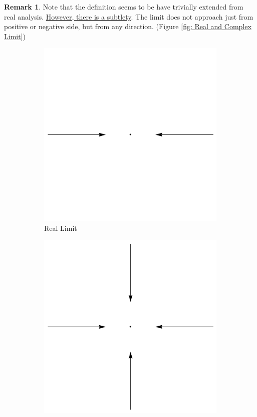 \documentclass[a4paper, 12pt]{article}
\theoremstyle{definition}
\newtheorem{remark}{Remark}
\numberwithin{definition}{section}
\numberwithin{exercise}{section}
\numberwithin{remark}{section}
\numberwithin{figure}{section}
\begin{document}
\begin{remark}
    Note that the definition seems to be have trivially extended from real analysis.
    \ul{However, there is a subtlety}.
    The limit does not approach just from positive or negative side,
    but from any direction. (Figure \ref{fig: Real and Complex Limit})
    \begin{figure}[tbp]
        \centering
        \begin{subfigure}[b]{0.5\textwidth}
            \centering
            \includegraphics[width=\textwidth]{realLimit}
            \caption{Real Limit}
        \end{subfigure}
        \hfill
        \begin{subfigure}[b]{0.5\textwidth}
            \centering
            \includegraphics[width=\textwidth]{complexLimit}

\end{subfigure}
\end{figure}
\end{remark}
\end{document}
